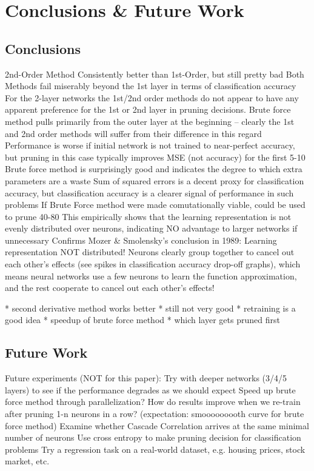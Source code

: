 \section{Conclusions \& Future Work}

\subsection{Conclusions}
2nd-Order Method Consistently better than 1st-Order, but still pretty bad
Both Methods fail miserably beyond the 1st layer in terms of classification accuracy
For the 2-layer networks the 1st/2nd order methods do not appear to have any apparent preference for the 1st or 2nd layer in pruning decisions. 
Brute force method pulls primarily from the outer layer at the beginning -- clearly the 1st and 2nd order methods will suffer from their difference in this regard
Performance is worse if initial network is not trained to near-perfect accuracy, but pruning in this case typically improves MSE (not accuracy) for the first 5-10%
Brute force method is surprisingly good and indicates the degree to which extra parameters are a waste
Sum of squared errors is a decent proxy for classification accuracy, but classification accuracy is a clearer signal of performance in such problems
If Brute Force method were made comutationally viable, could be used to prune 40-80%
This empirically shows that the learning representation is not evenly distributed over neurons, indicating NO advantage to larger networks if unnecessary
Confirms Mozer \& Smolensky's conclusion in 1989: Learning representation NOT distributed!
Neurons clearly group together to cancel out each other's effects (see spikes in classification accuracy drop-off graphs), which means neural networks use a few neurons to learn the function approximation, and the rest cooperate to cancel out each other's effects!

* second derivative method works better
* still not very good
* retraining is a good idea
* speedup of brute force method
* which layer gets pruned first

\subsection{Future Work}
Future experiments (NOT for this paper):
Try with deeper networks (3/4/5 layers) to see if the performance degrades as we should expect
Speed up brute force method through parallelization?
How do results improve when we re-train after pruning 1-n neurons in a row? (expectation: smooooooooth curve for brute force method)
Examine whether Cascade Correlation arrives at the same minimal number of neurons
Use cross entropy to make pruning decision for classification problems
Try a regression task on a real-world dataset, e.g. housing prices, stock market, etc. 
